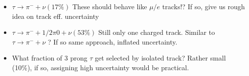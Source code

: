 \documentclass{beamer}
\begin{document}
\begin{frame}
\begin{columns}
\begin{column}{0.35\textwidth}
 \end{column}
\end{columns}
\begin{itemize}
 \item $\tau\rightarrow\pi^{-} + \nu (17\%)$ These should behave like $\mu/e$ tracks!? If so, give us rough idea on track eff. uncertainty
   \item $\tau\rightarrow\pi^{-} + 1/2\pi0 + \nu (53\%)$ Still only one charged track. Similar to $\tau\rightarrow\pi^{-} + \nu$ ? If so same approach, inflated uncertainty.
   \item What fraction of 3 prong $\tau$ get selected by isolated track? Rather small (10\%), if so, assigning high uncertainty would be practical.
\end{itemize}
\end{frame}
\end{document}
